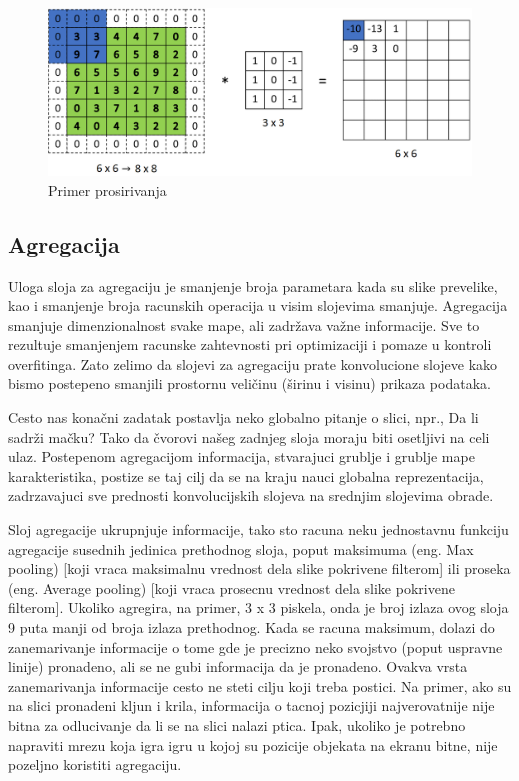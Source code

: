 \documentclass[a4paper]{article}
\begin{document}
\begin{figure}[h!]
\begin{center}
\includegraphics[scale=0.38]{padding.png}
\end{center}
\caption{Primer prosirivanja}
\label{fig:padding}
\end{figure}


\subsection{Agregacija}


Uloga sloja za agregaciju je smanjenje broja parametara kada su slike prevelike, kao i smanjenje broja racunskih operacija u visim slojevima smanjuje. Agregacija smanjuje dimenzionalnost svake mape, ali zadržava važne informacije. Sve to rezultuje smanjenjem racunske zahtevnosti pri optimizaciji i pomaze u kontroli overfitinga. Zato zelimo da slojevi za agregaciju prate konvolucione slojeve kako bismo postepeno smanjili prostornu veličinu (širinu i visinu) prikaza podataka.

Cesto nas konačni zadatak postavlja neko globalno pitanje o slici, npr., Da li sadrži mačku? Tako da čvorovi našeg zadnjeg sloja moraju biti osetljivi na celi ulaz. Postepenom agregacijom informacija, stvarajuci grublje i grublje mape karakteristika, postize se taj cilj da se na kraju nauci globalna reprezentacija, zadrzavajuci sve prednosti konvolucijskih slojeva na srednjim slojevima obrade.

Sloj agregacije ukrupnjuje informacije, tako sto racuna neku jednostavnu funkciju agregacije susednih jedinica prethodnog sloja, poput maksimuma (eng. Max pooling) [koji vraca maksimalnu vrednost dela slike pokrivene filterom] ili proseka (eng. Average pooling) [koji vraca prosecnu vrednost dela slike pokrivene filterom]. Ukoliko agregira, na primer, 3 x 3 piskela, onda je broj izlaza ovog sloja 9 puta manji od broja izlaza prethodnog. Kada se racuna maksimum, dolazi do zanemarivanje informacije o tome gde je precizno neko svojstvo (poput uspravne linije) pronadeno, ali se ne gubi informacija da je pronadeno. Ovakva vrsta zanemarivanja informacije cesto ne steti cilju koji treba postici. Na primer, ako su na slici pronadeni kljun i krila, informacija o tacnoj pozicjiji najverovatnije nije bitna za odlucivanje da li se na slici nalazi ptica. Ipak, ukoliko je potrebno napraviti mrezu koja igra igru u kojoj su pozicije objekata na ekranu bitne, nije pozeljno koristiti agregaciju.
\end{document}
